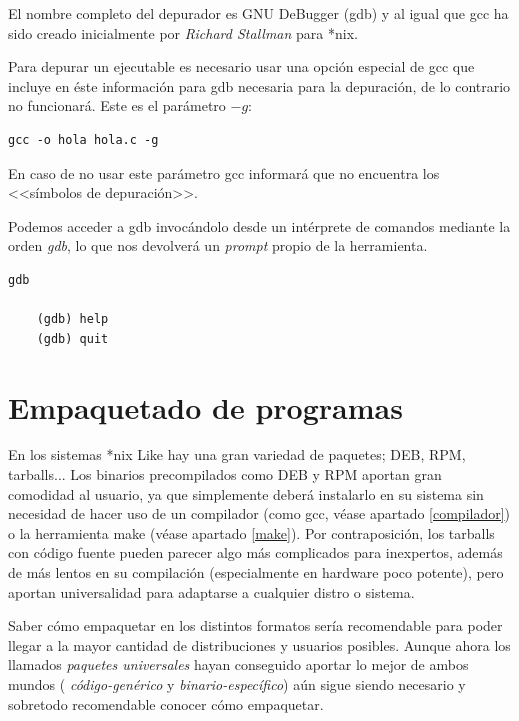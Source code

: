 \documentclass[a4paper, 11pt, titlepage]{article}
\begin{document}
    El nombre completo del depurador es GNU DeBugger (gdb) y al igual que gcc ha sido creado
    inicialmente por \textit{Richard Stallman} para *nix.

    Para depurar un ejecutable es necesario usar una opción especial de gcc que incluye en 
    éste información para gdb necesaria para la depuración, de lo contrario no funcionará. 
    Este es el parámetro $-g$:

    \begin{lstlisting}[language=make]
    gcc -o hola hola.c -g\end{lstlisting}

    En caso de no usar este parámetro gcc informará que no encuentra los <<símbolos de 
    depuración>>. 

    Podemos acceder a gdb invocándolo desde un intérprete de comandos mediante la orden 
    \textit{gdb}, lo que nos devolverá un \textit{prompt} propio de la herramienta.

    \begin{lstlisting}[language=make]
    gdb

    (gdb) help
    (gdb) quit\end{lstlisting}


\section{Empaquetado de programas}

    En los sistemas *nix Like hay una gran variedad de paquetes; DEB, RPM, tarballs...
    Los binarios precompilados como DEB y RPM aportan gran comodidad al usuario, ya que simplemente 
    deberá instalarlo en su sistema sin necesidad de hacer uso de un compilador (como gcc, véase 
    apartado \ref{compilador}) o la herramienta make (véase apartado \ref{make}). Por 
    contraposición, los tarballs con código fuente pueden parecer algo más complicados 
    para inexpertos, además de más lentos en su compilación (especialmente en hardware poco 
    potente), pero aportan universalidad para adaptarse a cualquier distro o sistema.

    Saber cómo empaquetar en los distintos formatos sería recomendable para poder llegar 
    a la mayor cantidad de distribuciones y usuarios posibles. Aunque ahora los llamados 
    \textit{paquetes universales} hayan conseguido aportar lo mejor de ambos mundos (
    \textit{código-genérico} y \textit{binario-específico}) aún sigue siendo necesario y 
    sobretodo recomendable conocer cómo empaquetar.
\end{document}
